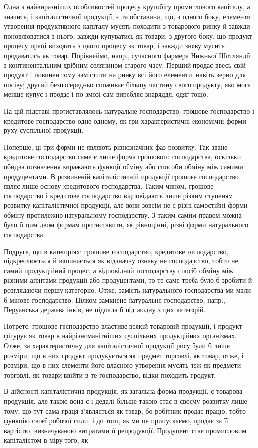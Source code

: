 Одна з найвиразніших особливостей процесу кругобігу промислового
капіталу, а значить, і капіталістичної продукції, є та обставина, що, з
одного боку, елементи утворення продуктивного капіталу мусять походити
з товарового ринку й завжди поновлюватися з нього, завжди купуватись
як товари; з другого боку, що продукт процесу праці виходить з
цього процесу як товар, і завжди знову мусить продаватись як товар.
Порівняймо, напр., сучасного фармера Нижньої Шотляндії з континентальним
дрібним селянином старого часу. Перший продає ввесь свій
продукт і повинен тому замістити на ринку всі його елементи, навіть
зерно для посіву; другий безпосередньо споживає більшу частину свого
продукту, яко мога менше купує і продає і по змозі сам виробляє знаряддя,
одяг тощо.

На цій підставі протиставлялось натуральне господарство, грошове
господарство і кредитове господарство одне одному, як три характеристичні
економічні форми руху суспільної продукції.

Поперше, ці три форми не являють рівнозначних фаз розвитку. Так
зване кредитове господарство саме є лише форма грошового господарства,
оскільки обидва позначення виражають функції обміну або способи
обміну між самими продуцентами. В розвиненій капіталістичній продукції
грошове господарство являє лише основу кредитового господарства.
Таким чином, грошове господарство і кредитове господарство відповідають
лише різним ступеням розвитку капіталістичної продукції, але
вони зовсім не є різні самостійні форми обміну протилежно натуральному
господарству. З таким самим правом можна було б цим двом формам
протиставити, як рівноцінні, різні форми натурального господарства.

Подруге, що в категоріях: грошове господарство, кредитове господарство,
підкреслюється й випинається як відзначну ознаку не господарство,
тобто не самий продукційний процес, а відповідний господарству спосіб
обміну між різними аґентами продукції або продуцентами, то те саме
треба було б зробити й розглядаючи першу категорію. Отже, замість
натурального господарства ми мали б мінове господарство. Цілком замкнене
натуральне господарство, напр., Перуанська держава інків, не підпала
б під жодну з цих категорій.

Потретє: грошове господарство властиве всякій товаровій продукції, і
продукт фігурує як товар в найрізноманітніших суспільних продукційних
організмах. Отже, за характеристичну для капіталістичної продукції рису
були б лише розміри, що в них продукт продукується як предмет торговлі,
як товар, отже, і розміри, що в них елементи його власного утворення
мусять теж як предмети торговлі, як товари ввійти в те господарство,
відки походить продукт.

В дійсності капіталістична продукція, як загальна форма продукції,
є товарова продукція, але такою вона є і дедалі більше такою стає в
своєму розвитку лише тому, що тут сама праця з’являється як товар, бо
робітник продає працю, тобто функцію своєї робочої сили, і до того, як
ми це припускаємо, продає за її вартістю, визначуваною витратами її
репродукції. Продуцент стає промисловим капіталістом в міру того, як
\parbreak{}  %
